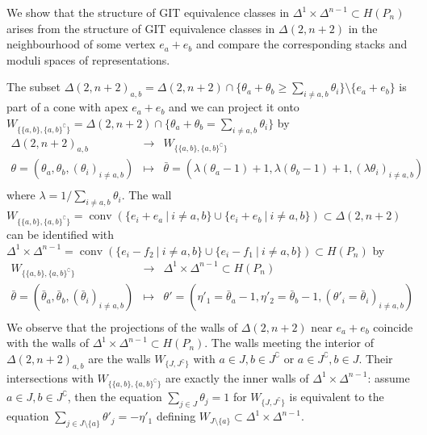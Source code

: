 \documentclass[ALCO,ThmDefs,Unicode,epreuves]{cedram}
\DeclareMathOperator{\conv}{conv}
\begin{document}
We show that the structure of GIT equivalence classes in 
$\Delta^1\times\Delta^{n-1}\subset H(P_n)$ arises from the
structure of GIT equivalence classes in $\Delta(2,n+2)$ in the 
neighbourhood of some vertex $e_a+e_b$ and compare the corresponding
stacks and moduli spaces of representations.


The subset $\Delta(2,n+2)_{a,b}=\Delta(2,n+2)\cap
\{\theta_a+\theta_b\geq\sum_{i\neq a,b}\theta_i\}\setminus\{e_a+e_b\}$ 
is part of a cone with apex $e_a+e_b$ and we can project it onto
$W_{\{\{a,b\},\{a,b\}^\complement\}}=\Delta(2,n+2)\cap
\{\theta_a+\theta_b=\sum_{i\neq a,b}\theta_i\}$ by
\[
\begin{array}{rcl}
\Delta(2,n+2)_{a,b}&\to&W_{\{\{a,b\},\{a,b\}^\complement\}}\\
\theta=(\theta_a,\theta_b,(\theta_i)_{i\neq a,b})&\mapsto&
\bar{\theta}=(\lambda(\theta_a-1)+1,\lambda(\theta_b-1)+1,(\lambda\theta_i)_{i\neq a,b})\\
\end{array}
\]
where $\lambda=1/\sum_{i\neq a,b}\theta_i$.
The wall $W_{\{\{a,b\},\{a,b\}^\complement\}}=\conv(\{e_i+e_a\:|\:i\neq a,b\}\cup
\{e_i+e_b\:|\:i\neq a,b\})\subset\Delta(2,n+2)$ can be identified with 
$\Delta^1\times\Delta^{n-1}=\conv(\{e_i-f_2\:|\:i\neq a,b\}\cup
\{e_i-f_1\:|\:i\neq a,b\})\subset H(P_n)$ by 
\[
\begin{array}{rcl}
W_{\{\{a,b\},\{a,b\}^\complement\}}&\to&\Delta^1\times\Delta^{n-1}\subset H(P_n)\\[1mm]
\bar{\theta}=(\bar{\theta}_a,\bar{\theta}_b,(\bar{\theta}_i)_{i\neq a,b})&\mapsto&
\theta'=(\eta'_1=\bar{\theta}_a-1,\eta'_2=\bar{\theta}_b-1,
(\theta'_i=\bar{\theta}_i)_{i\neq a,b})\\
\end{array}
\]
We observe that the projections of the walls of $\Delta(2,n+2)$ near $e_a+e_b$
coincide with the walls of $\Delta^1\times\Delta^{n-1}\subset H(P_n)$. 
The walls meeting the interior of $\Delta(2,n+2)_{a,b}$ are the walls 
$W_{\{J,J^\complement\}}$ with $a\in J,b\in J^\complement$ or $a\in J^\complement,b\in J$. 
Their intersections with $W_{\{\{a,b\},\{a,b\}^\complement\}}$ are exactly the 
inner walls of $\Delta^1\times\Delta^{n-1}$: assume $a\in J, b\in J^\complement$, 
then the equation $\sum_{j\in J}\theta_j=1$ for $W_{\{J,J^\complement\}}$ 
is equivalent to the equation $\sum_{j\in J\setminus\{a\}}\theta'_j=-\eta'_1$
defining $W_{J\setminus\{a\}}\subset\Delta^1\times\Delta^{n-1}$.
\end{document}
